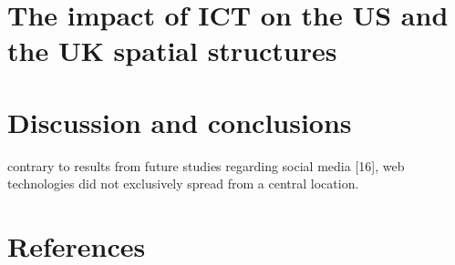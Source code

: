 \documentclass[10pt,letterpaper]{article}
\begin{document}
\hypertarget{sec5}{%
\section{The impact of ICT on the US and the UK spatial
structures}\label{sec5}}

\hypertarget{sec6}{%
\section{Discussion and conclusions}\label{sec6}}

contrary to results from future studies regarding social media {[}16{]},
web technologies did not exclusively spread from a central location.

\hypertarget{references}{%
\section*{References}\label{references}}
\end{document}
